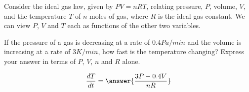\documentclass{ximera}
\author{David Guichard \and Neal Koblitz \and H. Jerome Keisler \and Albert Scheller \and Barry Balof \and Mike Wills \and Matthew Carr}
\begin{document}
\begin{exercise}




Consider the ideal gas law, given by $PV=nRT$, relating pressure, $P$, volume, $V$, and the temperature $T$ of $n$ moles of gas, where $R$ is the ideal gas constant. We can view $P$, $V$ and $T$ each as functions of the other two variables. 

If the pressure of a gas is decreasing at a rate of $0.4\unit{Pa/min}$ and the volume is increasing at a rate of $3\unit{K/min}$, how fast is the temperature changing? Express your answer in terms of $P$, $V$, $n$ and $R$ alone.

\begin{prompt}
\[
\frac{d T}{d t}=\answer{\frac{3P-0.4 V}{n R}}
\]
\end{prompt}

\end{exercise}
\end{document}
